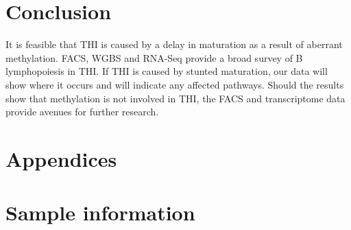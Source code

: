 \documentclass[12pt]{article}
\begin{document}
			
	\section{Conclusion}
	
		It is feasible that THI is caused by a delay in maturation as a result of aberrant methylation. 
		FACS, WGBS and RNA-Seq provide a broad survey of B lymphopoiesis in THI.
		If THI is caused by stunted maturation, our data will show where it occurs and will indicate any affected pathways.
		Should the results show that methylation is not involved in THI, the FACS and transcriptome data provide avenues for further research.


	\section{Appendices}
	\appendix

	
	\section{Sample information}
\end{document}
